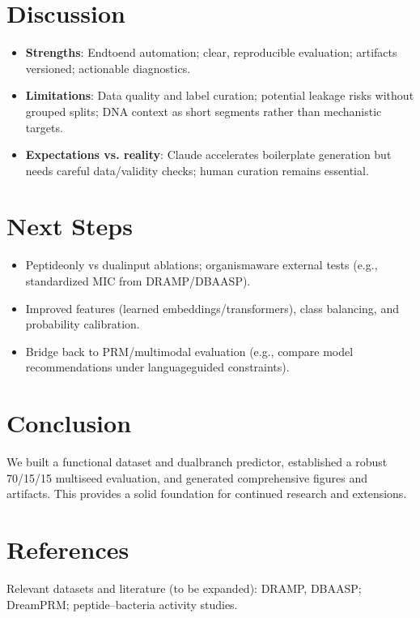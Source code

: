 \documentclass{article}
\begin{document}
\section{Discussion}
\begin{itemize}[leftmargin=*,nosep]
  \item \textbf{Strengths}: End\-to\-end automation; clear, reproducible evaluation; artifacts versioned; actionable diagnostics.
  \item \textbf{Limitations}: Data quality and label curation; potential leakage risks without grouped splits; DNA context as short segments rather than mechanistic targets.
  \item \textbf{Expectations vs. reality}: Claude accelerates boilerplate generation but needs careful data/validity checks; human curation remains essential.
\end{itemize}

\section{Next Steps}
\begin{itemize}[leftmargin=*,nosep]
  \item Peptide\-only vs dual\-input ablations; organism\-aware external tests (e.g., standardized MIC from DRAMP/DBAASP).
  \item Improved features (learned embeddings/transformers), class balancing, and probability calibration.
  \item Bridge back to PRM/multimodal evaluation (e.g., compare model recommendations under language\-guided constraints).
\end{itemize}

\section{Conclusion}
We built a functional dataset and dual\-branch predictor, established a robust 70/15/15 multi\-seed evaluation, and generated comprehensive figures and artifacts. This provides a solid foundation for continued research and extensions.

\section*{References}
Relevant datasets and literature (to be expanded): DRAMP, DBAASP; DreamPRM; peptide--bacteria activity studies.
\end{document}
